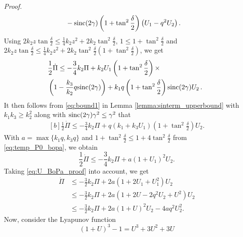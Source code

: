 \documentclass[journal,twoside,web]{ieeecolor}
\theoremstyle{definition}
\renewenvironment{proof}[1][Proof]{\par\pushQED{\qed}\normalfont\textit{#1.}~}{\popQED\par}
\begin{document}
\begin{proof}
\begin{equation}
\begin{aligned}[b]
&- 
{\rm sinc}(2\gamma)\left(1+\tan^2\frac{\delta}{2 }\right)  \left( U_1 - q^2 U_2 \right). \label{eq:Pi_dot_BoPa_temp}
\end{aligned}
\end{equation}
Using $2 k_2 z \tan \frac{\delta}{2} \leq  \frac{1}{4}k_2 z^2 + 2 k_2 \tan^2 \frac{\delta}{2}$, $ 1  \le 1+\tan^2\frac{\delta}{2} $ and $2k_2 z \tan \frac{\delta}{2} \leq  \frac{1}{4}k_2 z^2 + 2 k_2 \tan^2 \frac{\delta}{2} \left(1+\tan^2\frac{\delta}{2}\right)$,
we get
\begin{equation}
\hspace*{-0.2cm}
\begin{aligned}[b]
&\frac{1}{2} \dot \Pi \le -  \frac{3}{4} k_2 \Pi +  k_2 U_1 \left( 1 + \tan^2\frac{\delta}{2} \right) \times  \\
& \left(1 - \frac{k_3}{k_2}q {\rm sinc}(2\gamma) \right) +k_1 q \left( 1 + \tan^2\frac{\delta}{2} \right) {\rm sinc}(2\gamma) U_2 \,. \label{eq:Pi_dot_BoPa_temp}
\end{aligned}
\end{equation}
It then follows from \eqref{eq:bound1} in Lemma \ref{lemma:sinterm_upperbound} with $k_1 k_3 \ge  k_2^2$ along with ${\rm sinc}(2\gamma) \gamma^2 \le \gamma^2$ that 
\begin{equation}
\begin{aligned}[b]
   \frac{1}{2}\dot \Pi \le -\frac{3}{4} k_2\Pi + q \left(k_1 + k_3U_1 \right)\left(1 +  \tan^2 \frac{\delta}{2}\right) U_2.
\end{aligned}
  \label{eq:temp_P0_bopa}
\end{equation}
With $a = \max\{k_1q,k_3q\}$ and $1+\tan^2\frac{\delta}{2} \le 1+ 4\tan^2\frac{\delta}{2}$ from
\eqref{eq:temp_P0_bopa}, we obtain 
\begin{equation}
\frac{1}{2} \dot{\Pi} \le -\frac{3}{4}k_2 \Pi + a \left(1 +  U_1\right)^2 U_2. \label{eq:Pi0_temp2_bopa}
\end{equation}
Taking \eqref{eq:U_BoPa_proof} into account, we get 
\begin{align}
\dot{\Pi} &\le -\frac{3}{2}k_2 \Pi + 2a   \left( 1 + 2U_1 + U_1^2\right) U_2 \nonumber \\
&\le -\frac{3}{2}k_2 \Pi + 2a   \left( 1 + 2U - 2q^2 U_2 + U^2 \right) U_2 \nonumber \\
&\le -\frac{3}{2}k_2 \Pi + 2a   \left( 1 + U \right)^2 U_2 - 4a q^2 U_2^2. \label{eq:Pi0_temp3_bopa}
\end{align}
Now, consider the Lyapunov function 
\begin{equation}
(1+U)^3 - 1 = U^3 + 3U^2 + 3U 

\end{equation}
\end{proof}
\end{document}
